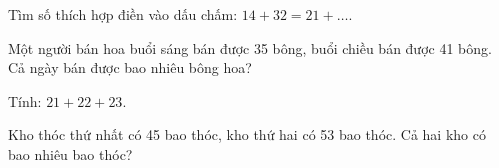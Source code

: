 \begin{ex} %
Tìm số thích hợp điền vào dấu chấm: $14 + 32 = 21 + \dots$.
\end{ex}

\begin{ex} %
Một người bán hoa buổi sáng bán được 35 bông, buổi chiều bán được 41 bông. Cả ngày bán được bao nhiêu bông hoa?
\end{ex}

\begin{ex} %
Tính: $21 + 22 + 23$.
\end{ex}

\begin{ex} %
Kho thóc thứ nhất có 45 bao thóc, kho thứ hai có 53 bao thóc. Cả hai kho có bao nhiêu bao thóc?
\end{ex}
